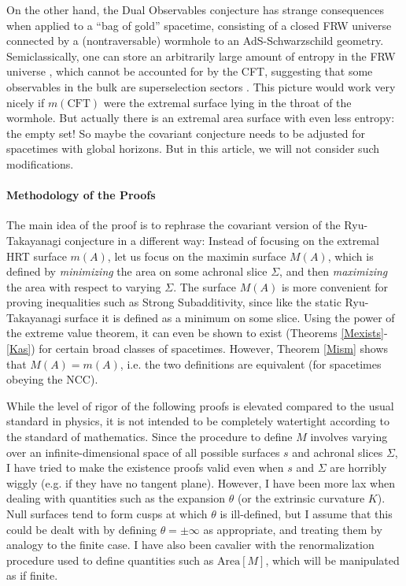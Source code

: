 \documentclass[12pt]{article}
\begin{document}
On the other hand, the Dual Observables conjecture has strange consequences when applied to a ``bag of gold'' spacetime, consisting of a closed FRW universe connected by a (nontraversable) wormhole to an AdS-Schwarzschild geometry.  Semiclassically, one can store an arbitrarily large amount of entropy in the FRW universe \cite{sorkin97,jacobson99,marolf08,FHMMRS05}, which cannot be accounted for by the CFT, suggesting that some observables in the bulk are superselection sectors \cite{MW12}.  This picture would work very nicely if $m(\mathrm{CFT})$ were the extremal surface lying in the throat of the wormhole.  But actually there is an extremal area surface with even less entropy: the empty set!  So maybe the covariant conjecture needs to be adjusted for spacetimes with global horizons.  But in this article, we will not consider such modifications.


\paragraph{Methodology of the Proofs} The main idea of the proof is to rephrase the covariant version of the Ryu-Takayanagi conjecture in a different way: Instead of focusing on the extremal HRT surface $m(A)$, let us focus on the maximin surface $M(A)$, which is defined by \emph{minimizing} the area on some achronal slice $\Sigma$, and then \emph{maximizing} the area with respect to varying $\Sigma$.  The surface $M(A)$ is more convenient for proving inequalities such as Strong Subadditivity, since like the static Ryu-Takayanagi surface it is defined as a minimum on some slice.  Using the power of the extreme value theorem, it can even be shown to exist (Theorems \ref{Mexists}-\ref{Kas}) for certain broad classes of spacetimes.  However, Theorem \ref{Mism} shows that $M(A) = m(A)$, i.e. the two definitions are equivalent (for spacetimes obeying the NCC).

While the level of rigor of the following proofs is elevated compared to the usual standard in physics, it is not intended to be completely watertight according to the standard of mathematics.  Since the procedure to define $M$ involves varying over an infinite-dimensional space of all possible surfaces $s$ and achronal slices $\Sigma$, I have tried to make the existence proofs valid even when $s$ and $\Sigma$ are horribly wiggly (e.g. if they have no tangent plane).  However, I have been more lax when dealing with quantities such as the expansion $\theta$ (or the extrinsic curvature $K$).  Null surfaces tend to form cusps at which $\theta$ is ill-defined, but I assume that this could be dealt with by defining $\theta = \pm \infty$ as appropriate, and treating them by analogy to the finite case.  I have also been cavalier with the renormalization procedure used to define quantities such as $\mathrm{Area}[M]$, which will be manipulated as if finite.  
\end{document}
